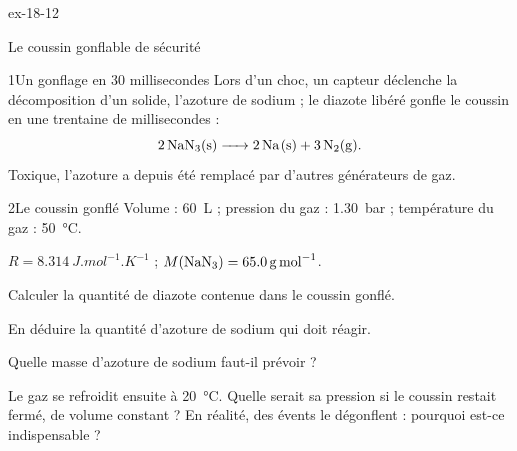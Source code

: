 \begin{blocLivre}{ex-18-12}
\begin{exercice}[3]{Le coussin gonflable de sécurité}
\begin{docu}{1}{Un gonflage en 30 millisecondes}
Lors d'un choc, un capteur déclenche la décomposition d'un solide, l'azoture de sodium  ; le diazote libéré
gonfle le coussin en une trentaine de millisecondes :
\[\ce{2 NaN3(s) -> 2 Na(s) + 3 N2(g)}.\]
Toxique, l'azoture a depuis été remplacé par d'autres générateurs de gaz.
\end{docu}
\begin{docu}{2}{Le coussin gonflé}
Volume : \qty{60}{L} ; pression du gaz : \qty{1,30}{bar} ; température du gaz : \qty{50}{\degreeCelsius}.
\end{docu}
\begin{donnees}
$R=\qty{8,314}{J.mol^{-1}.K^{-1}}$ ; $M(\ce{NaN3})=\qty{65,0}{g.mol^{-1}}$.
\end{donnees}
\begin{questions}
\item Calculer la quantité de diazote contenue dans le coussin gonflé.
\item En déduire la quantité d'azoture de sodium qui doit réagir.
\item \initiative Quelle masse d'azoture de sodium faut-il prévoir ?
\item Le gaz se refroidit ensuite à \qty{20}{\degreeCelsius}. Quelle serait sa pression si le coussin restait fermé, de volume
constant ? En réalité, des évents le dégonflent : pourquoi est-ce indispensable ?
\end{questions}
\end{exercice}
\end{blocLivre}
